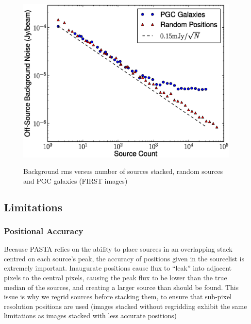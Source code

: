 \documentclass{article}
\begin{document}
\begin{figure}[H]
\centering
\includegraphics[trim=0cm 0cm 0cm 1cm, clip, scale=0.7]{FIRST_noise_vs_num.eps}\\
\caption[Stacking Performance for FIRST]{Background rms versus number of 
sources stacked, random sources and PGC galaxies (FIRST images)}
\end{figure}
\subsection{Limitations}
\subsubsection{Positional Accuracy}
Because PASTA relies on the ability to place sources in an overlapping stack 
centred on each source's peak, the accuracy of positions given in the sourcelist
is extremely important.  Inaugurate positions cause flux to ``leak'' into 
adjacent pixels to the central pixels, causing the peak flux to be lower than 
the true median of the sources, and creating a larger source than should be 
found.  This issue is why we regrid sources before stacking them, to ensure that
sub-pixel resolution positions are used (images stacked without regridding 
exhibit the same limitations as images stacked with less accurate positions)\par
\end{document}
